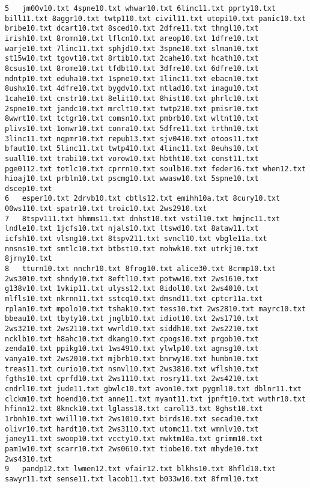 \documentclass{article}
\begin{document}
\begin{lstlisting}
5	jm00v10.txt 4spne10.txt whwar10.txt 6linc11.txt pprty10.txt bill11.txt 8aggr10.txt twtp110.txt civil11.txt utopi10.txt panic10.txt bribe10.txt dcart10.txt 8sced10.txt 2dfre11.txt thngl10.txt irish10.txt 8romn10.txt lflcn10.txt areop10.txt 1dfre10.txt warje10.txt 7linc11.txt sphjd10.txt 3spne10.txt slman10.txt st15w10.txt tgovt10.txt 8rtib10.txt 2cahe10.txt hcath10.txt 8csus10.txt 8rome10.txt tfdbt10.txt 3dfre10.txt 6dfre10.txt mdntp10.txt eduha10.txt 1spne10.txt 1linc11.txt ebacn10.txt 8ushx10.txt 4dfre10.txt bygdv10.txt mtlad10.txt inagu10.txt 1cahe10.txt cnstr10.txt 8elit10.txt 8hist10.txt phrlc10.txt 2spne10.txt jandc10.txt mrclt10.txt twtp210.txt pmisr10.txt 8wwrt10.txt tctgr10.txt comsn10.txt pmbrb10.txt wltnt10.txt plivs10.txt 1onwr10.txt conra10.txt 5dfre11.txt trthn10.txt 3linc11.txt nqpmr10.txt repub13.txt sjv0410.txt otoos11.txt bfaut10.txt 5linc11.txt twtp410.txt 4linc11.txt 8euhs10.txt suall10.txt trabi10.txt vorow10.txt hbtht10.txt const11.txt pge0112.txt totlc10.txt cprrn10.txt soulb10.txt feder16.txt when12.txt hioaj10.txt prblm10.txt pscmg10.txt wwasw10.txt 5spne10.txt dscep10.txt
6	esper10.txt 2drvb10.txt cbtls12.txt emihh10a.txt 8cury10.txt 00ws110.txt spatr10.txt troic10.txt 2ws2910.txt
7	8tspv111.txt hhmms11.txt dnhst10.txt vstil10.txt hmjnc11.txt lndle10.txt 1jcfs10.txt njals10.txt ltswd10.txt 8ataw11.txt icfsh10.txt vlsng10.txt 8tspv211.txt svncl10.txt vbgle11a.txt nnsns10.txt smtlc10.txt btbst10.txt mohwk10.txt utrkj10.txt 8jrny10.txt
8	tturn10.txt nnchr10.txt 8frog10.txt alice30.txt 8crmp10.txt 2ws3010.txt shndy10.txt 8eftl10.txt potww10.txt 2ws1610.txt g138v10.txt 1vkip11.txt ulyss12.txt 8idol10.txt 2ws4010.txt mlfls10.txt nkrnn11.txt sstcq10.txt dmsnd11.txt cptcr11a.txt rplan10.txt mpolo10.txt tshak10.txt tess10.txt 2ws2810.txt mayrc10.txt bbeau10.txt tbyty10.txt jnglb10.txt idiot10.txt 2ws1710.txt 2ws3210.txt 2ws2110.txt wwrld10.txt siddh10.txt 2ws2210.txt ncklb10.txt h8ahc10.txt dkang10.txt cpogs10.txt prgob10.txt zenda10.txt ppikg10.txt 1ws4910.txt ylwlp10.txt agnsg10.txt vanya10.txt 2ws2010.txt mjbrb10.txt bnrwy10.txt humbn10.txt treas11.txt curio10.txt nsnvl10.txt 2ws3810.txt wflsh10.txt fgths10.txt cprfd10.txt 2ws1110.txt rosry11.txt 2ws4210.txt cndrl10.txt jude11.txt gbwlc10.txt avon10.txt pygml10.txt dblnr11.txt clckm10.txt hoend10.txt anne11.txt myant11.txt jpnft10.txt wuthr10.txt hfinn12.txt 8knck10.txt lglass18.txt carol13.txt 8ghst10.txt 1rbnh10.txt wwill10.txt 2ws1010.txt birds10.txt secad10.txt olivr10.txt hardt10.txt 2ws3110.txt utomc11.txt wmnlv10.txt janey11.txt swoop10.txt vccty10.txt mwktm10a.txt grimm10.txt pam1w10.txt scarr10.txt 2ws0610.txt tiobe10.txt mhyde10.txt 2ws4310.txt
9	pandp12.txt lwmen12.txt vfair12.txt blkhs10.txt 8hfld10.txt sawyr11.txt sense11.txt lacob11.txt b033w10.txt 8frml10.txt
\end{lstlisting}
\end{document}
